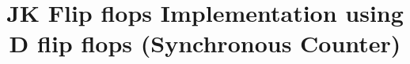 \documentclass[journal,12pt,twocolumn]{IEEEtran}
\begin{document}
	
	
	\makeatletter
	\makeatother
	
	\let\StandardTheFigure\thefigure
	\let\StandardTheTable\thetable
	\renewcommand{\thetable}{\theproblem}
	
	
	\vspace{3cm}
	\title{
		
		\centering
		JK Flip flops Implementation using D flip flops (Synchronous Counter)
		\centering
		
	}

	
	
	
\end{document}
